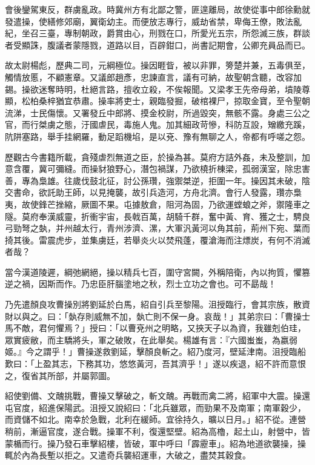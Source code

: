 \begin{pinyinscope}
會後鑾駕東反，群虜亂政。時冀州方有北鄙之警，匪遑離局，故使從事中郎徐勳就發遣操，使繕修郊廟，翼衛幼主。而便放志專行，威劫省禁，卑侮王僚，敗法亂紀，坐召三臺，專制朝政，爵賞由心，刑戮在口，所愛光五宗，所怨滅三族，群談者受顯誅，腹議者蒙隱戮，道路以目，百辟鉗口，尚書記期會，公卿充員品而已。

故太尉楊彪，歷典二司，元綱極位。操因睚眥，被以非罪，篣楚并兼，五毒俱至，觸情放慝，不顧憲章。又議郎趙彥，忠諫直言，議有可納，故聖朝含聽，改容加錫。操欲迷奪時明，杜絕言路，擅收立殺，不俟報聞。又梁孝王先帝母弟，墳陵尊顯，松柏桑梓猶宜恭肅。操率將吏士，親臨發掘，破棺裸尸，掠取金寶，至令聖朝流涕，士民傷懷。又署發丘中郎將、摸金校尉，所過毀突，無骸不露。身處三公之官，而行桀虜之態，汙國虐民，毒施人鬼。加其細政苛慘，科防互設，矰繳充蹊，阬阱塞路，舉手挂網羅，動足蹈機埳，是以兗、豫有無聊之人，帝都有呼嗟之怨。

歷觀古今書籍所載，貪殘虐烈無道之臣，於操為甚。莫府方詰外姦，未及整訓，加意含覆，冀可彌縫。而操豺狼野心，潛包禍謀，乃欲橈折棟梁，孤弱漢室，除忠害善，專為梟雄。往歲伐鼓北征，討公孫瓚，強禦桀逆，拒圍一年。操因其未破，陰交書命，欲託助王師，以見掩襲，故引兵造河，方舟北濟。會行人發露，瓚亦梟夷，故使鋒芒挫縮，厥圖不果。屯據敖倉，阻河為固，乃欲運螳蜋之斧，禦隆車之隧。莫府奉漢威靈，折衝宇宙，長戟百萬，胡騎千群，奮中黃、育、獲之士，騁良弓勁弩之埶，并州越太行，青州涉濟、漯，大軍汎黃河以角其前，荊州下宛、葉而掎其後。雷震虎步，並集虜廷，若舉炎火以焚飛蓬，覆滄海而注熛炭，有何不消滅者哉？

當今漢道陵遲，綱弛網絕，操以精兵七百，圍守宮闕，外稱陪衛，內以拘質，懼篡逆之禍，因斯而作。乃忠臣肝腦塗地之秋，烈士立功之會也。可不勗哉！

乃先遣顏良攻曹操別將劉延於白馬，紹自引兵至黎陽。沮授臨行，會其宗族，散資財以與之。曰：「埶存則威無不加，埶亡則不保一身。哀哉！」其弟宗曰：「曹操士馬不敵，君何懼焉？」授曰：「以曹兗州之明略，又挾天子以為資，我雖剋伯珪，眾實疲敝，而主驕將头，軍之破敗，在此舉矣。楊雄有言：『六國蚩蚩，為嬴弱姬。』今之謂乎！」曹操遂救劉延，擊顏良斬之。紹乃度河，壁延津南。沮授臨船歎曰：「上盈其志，下務其功，悠悠黃河，吾其濟乎！」遂以疾退，紹不許而意恨之，復省其所部，并屬郭圖。

紹使劉備、文醜挑戰，曹操又擊破之，斬文醜。再戰而禽二將，紹軍中大震。操還屯官度，紹進保陽武。沮授又說紹曰：「北兵雖眾，而勁果不及南軍；南軍穀少，而資儲不如北。南幸於急戰，北利在緩師。宜徐持久，曠以日月。」紹不從。連營稍前，漸逼官度，遂合戰。操軍不利，復還堅壁。紹為高櫓，起土山，射營中，皆蒙楯而行。操乃發石車擊紹樓，皆破，軍中呼曰「霹靂車」。紹為地道欲襲操，操輒於內為長塹以拒之。又遣奇兵襲紹運車，大破之，盡焚其穀食。


\end{pinyinscope}
